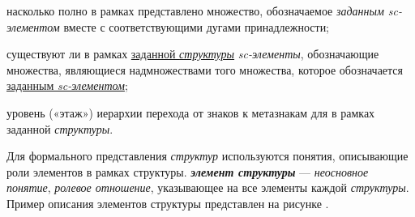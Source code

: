 \begin{SCn}
\begin{scnitemize}
	\item насколько полно в рамках  представлено множество, обозначаемое \textit{заданным sc-элементом} вместе с соответствующими дугами принадлежности;
	\item существуют ли в рамках \uline{заданной \textit{структуры}} \textit{sc-элементы}, обозначающие множества, являющиеся надмножествами того множества, которое обозначается \uline{заданным \textit{sc-элементом}};
	\item уровень («этаж») иерархии перехода от знаков к метазнакам для  в рамках заданной \textit{структуры}.
\end{scnitemize}
\end{SCn}

\bigskip
Для формального представления \textit{структур} используются понятия, описывающие роли элементов в рамках структуры. \textbf{\textit{элемент структуры\scnrolesign}} --- \textit{неосновное понятие}, \textit{ролевое отношение}, указывающее на все элементы каждой \textit{структуры}. Пример описания элементов структуры представлен на рисунке \textit{}.

